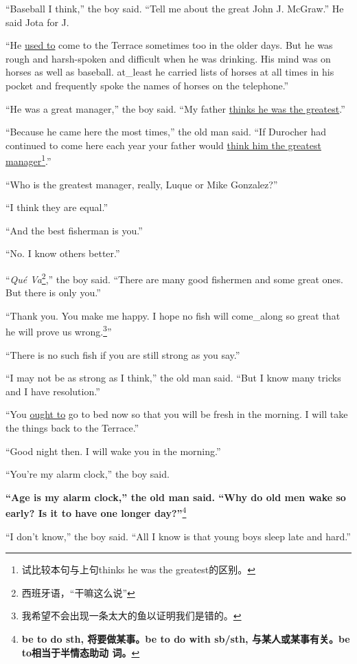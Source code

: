 ``Baseball I think,'' the boy said. ``Tell me about the great John J. McGraw.'' He said Jota for J.

``He \uline{used to} come to the Terrace sometimes too in the older days. But
he was \gls{rough} and \gls{harsh}-\gls{spoken} and difficult when he was
drinking. His mind was on \glspl{horse} as well as baseball. \Gls{at_least}
he carried lists of horses at all times in his pocket and \gls{frequently}
spoke the names of horses on the telephone.''

``He was a great manager,'' the boy said. ``My father \uline{thinks he was the greatest}.''

``Because he came here the most times,'' the old man said. ``If Durocher had
continued to come here each year your father would \uline{think him the
  greatest manager}\footnote{试比较本句与上句thinks he was the greatest的区别。}.''

``Who is the greatest manager, really, Luque or Mike Gonzalez?''

``I think they are \gls{equal}.''

``And the best fisherman is you.''

``No. I know others better.''

``\emph{Qué Va}\footnote{西班牙语，“干嘛这么说”},'' the boy said. ``There are
many good fishermen and some great ones. But there is only you.''

``Thank you. You make me happy. I hope no fish will \gls{come_along} so great that
he will prove us wrong.\footnote{我希望不会出现一条太大的鱼以证明我们是错的。}''

``There is no such fish if you are still strong as you say.''

``I may not be as strong as I think,'' the old man said. ``But I know many tricks and I have \gls{resolution}.''

``You \uline{ought to} go to bed now so that you will be \gls{fresh} in the
morning. I will take the things back to the Terrace.''

``Good night then. I will wake you in the morning.''

``You're my alarm clock,'' the boy said.

\textbf{``Age is my alarm clock,'' the old man said. ``Why do old men wake
  so early? Is it to have one longer day?''}\footnote{\textbf{be to do sth,
    将要做某事。be to do with sb/sth, 与某人或某事有关。be to相当于半情态助动
    词。}}

``I don't know,'' the boy said. ``All I know is that young boys sleep late and hard.''

